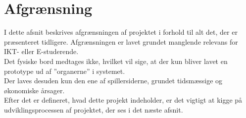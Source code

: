 \documentclass[Rapport/Rapport_main.tex]{subfiles}
\begin{document}
\section{Afgrænsning}\label{sec:afgraensning}
I dette afsnit beskrives afgrænsningen af projektet i forhold til alt det, der er præsenteret tidligere. Afgrænsningen er lavet grundet manglende relevans for IKT- eller E-studerende.\\
Det fysiske bord medtages ikke, hvilket vil sige, at der kun bliver lavet en prototype ud af ''organerne'' i systemet.\\
Der laves desuden kun den ene af spillersiderne, grundet tidsmæssige og økonomiske årsager.\\

Efter det er defineret, hvad dette projekt indeholder, er det vigtigt at kigge på udviklingsprocessen af projektet, der ses i det næste afsnit.
\end{document}
